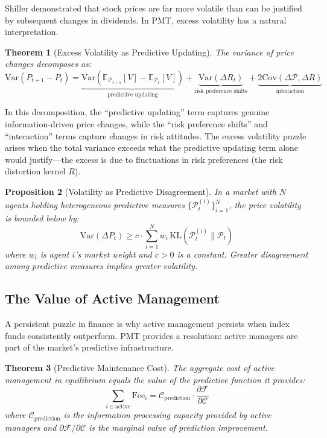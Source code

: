 \documentclass[12pt,a4paper]{article}
\newtheorem{theorem}{Theorem}[section]
\newtheorem{proposition}[theorem]{Proposition}
\theoremstyle{definition}
\newcommand{\E}{\mathbb{E}}
\newcommand{\PP}{\mathcal{P}}
\newcommand{\KL}{\mathrm{KL}}
\newcommand{\Var}{\mathrm{Var}}
\newcommand{\Cov}{\mathrm{Cov}}
\begin{document}
Shiller \citep{shiller1981} demonstrated that stock prices are far more volatile than can be justified by subsequent changes in dividends. In PMT, excess volatility has a natural interpretation.

\begin{theorem}[Excess Volatility as Predictive Updating]\label{thm:excess_vol}
The variance of price changes decomposes as:
\begin{equation}\label{eq:excess_vol}
    \Var(P_{t+1} - P_t) = \underbrace{\Var\left(\E_{\PP_{t+1}}[V] - \E_{\PP_t}[V]\right)}_{\text{predictive updating}} + \underbrace{\Var(\Delta R_t)}_{\text{risk preference shifts}} + \underbrace{2\Cov(\Delta \PP, \Delta R)}_{\text{interaction}}
\end{equation}
\end{theorem}

In this decomposition, the ``predictive updating'' term captures genuine information-driven price changes, while the ``risk preference shifts'' and ``interaction'' terms capture changes in risk attitudes. The excess volatility puzzle arises when the total variance exceeds what the predictive updating term alone would justify---the excess is due to fluctuations in risk preferences (the risk distortion kernel $R$).

\begin{proposition}[Volatility as Predictive Disagreement]\label{prop:vol_disagreement}
In a market with $N$ agents holding heterogeneous predictive measures $\{\PP_t^{(i)}\}_{i=1}^N$, the price volatility is bounded below by:
\begin{equation}
    \Var(\Delta P_t) \geq c \cdot \sum_{i=1}^{N} w_i \, \KL(\PP_t^{(i)} \| \PP_t)
\end{equation}
where $w_i$ is agent $i$'s market weight and $c > 0$ is a constant. Greater disagreement among predictive measures implies greater volatility.
\end{proposition}

\subsection{The Value of Active Management}

A persistent puzzle in finance is why active management persists when index funds consistently outperform. PMT provides a resolution: active managers are part of the market's predictive infrastructure.

\begin{theorem}[Predictive Maintenance Cost]\label{thm:active_mgmt}
The aggregate cost of active management in equilibrium equals the value of the predictive function it provides:
\begin{equation}\label{eq:active_cost}
    \sum_{i \in \text{active}} \text{Fee}_i = \mathcal{C}_{\text{prediction}} \cdot \frac{\partial \mathcal{F}}{\partial \mathcal{C}}
\end{equation}
where $\mathcal{C}_{\text{prediction}}$ is the information processing capacity provided by active managers and $\partial \mathcal{F} / \partial \mathcal{C}$ is the marginal value of prediction improvement.
\end{theorem}
\end{document}
